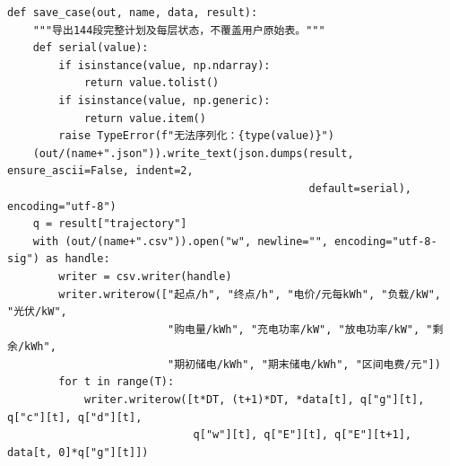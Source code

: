 \documentclass[withoutpreface,bwprint]{cumcmthesis}
\begin{document}
\begin{appendices}
\begin{lstlisting}
def save_case(out, name, data, result):
    """导出144段完整计划及每层状态，不覆盖用户原始表。"""
    def serial(value):
        if isinstance(value, np.ndarray):
            return value.tolist()
        if isinstance(value, np.generic):
            return value.item()
        raise TypeError(f"无法序列化：{type(value)}")
    (out/(name+".json")).write_text(json.dumps(result, ensure_ascii=False, indent=2,
                                               default=serial), encoding="utf-8")
    q = result["trajectory"]
    with (out/(name+".csv")).open("w", newline="", encoding="utf-8-sig") as handle:
        writer = csv.writer(handle)
        writer.writerow(["起点/h", "终点/h", "电价/元每kWh", "负载/kW", "光伏/kW",
                         "购电量/kWh", "充电功率/kW", "放电功率/kW", "剩余/kWh",
                         "期初储电/kWh", "期末储电/kWh", "区间电费/元"])
        for t in range(T):
            writer.writerow([t*DT, (t+1)*DT, *data[t], q["g"][t], q["c"][t], q["d"][t],
                             q["w"][t], q["E"][t], q["E"][t+1], data[t, 0]*q["g"][t]])



\end{lstlisting}
\end{appendices}
\end{document}
